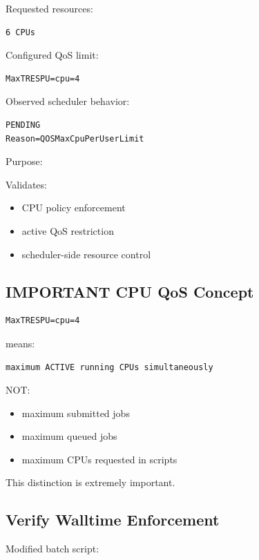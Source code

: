 \documentclass[11pt]{article}
\begin{document}
Requested resources:

\begin{verbatim}
6 CPUs
\end{verbatim}

Configured QoS limit:

\begin{verbatim}
MaxTRESPU=cpu=4
\end{verbatim}

Observed scheduler behavior:

\begin{verbatim}
PENDING
Reason=QOSMaxCpuPerUserLimit
\end{verbatim}

Purpose:

Validates:

\begin{itemize}
\item CPU policy enforcement
\item active QoS restriction
\item scheduler-side resource control
\end{itemize}
\subsection{IMPORTANT CPU QoS Concept}
\label{sec:org5e460f2}

\begin{verbatim}
MaxTRESPU=cpu=4
\end{verbatim}

means:

\begin{verbatim}
maximum ACTIVE running CPUs simultaneously
\end{verbatim}

NOT:

\begin{itemize}
\item maximum submitted jobs
\item maximum queued jobs
\item maximum CPUs requested in scripts
\end{itemize}

This distinction is extremely important.
\subsection{Verify Walltime Enforcement}
\label{sec:orgb11275c}

Modified batch script:
\end{document}
